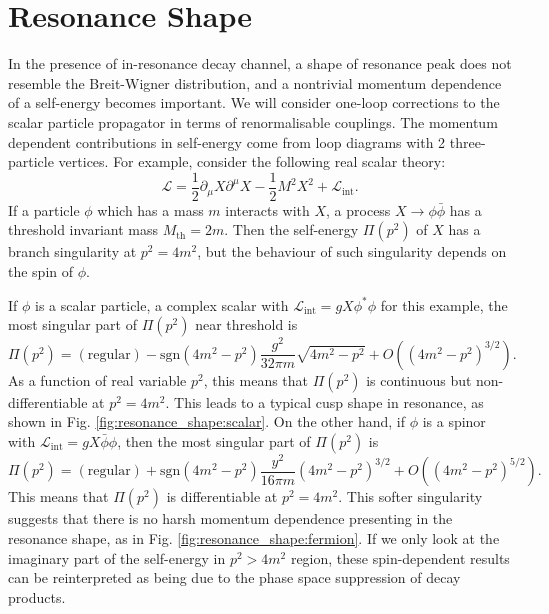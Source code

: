 \documentclass[11pt]{article}
\theoremstyle{definition}
\theoremstyle{remark}
\begin{document}
	\section{Resonance Shape}
	In the presence of in-resonance decay channel, a shape of resonance peak does not resemble the Breit-Wigner distribution, and a nontrivial momentum dependence of a self-energy becomes important.	
	We will consider one-loop corrections to the scalar particle propagator in terms of renormalisable couplings.
	The momentum dependent contributions in self-energy come from loop diagrams with 2 three-particle vertices.
	For example, consider the following real scalar theory:
	\[\mathcal{L}=\frac{1}{2}\partial_{\mu}X\partial^{\mu}X-\frac{1}{2}M^{2}X^{2}+\mathcal{L}_{\mathrm{int}}.\]
	If a particle $\phi$ which has a mass $m$ interacts with $X$, a process $X\to\phi\bar{\phi}$ has a threshold invariant mass $M_{\mathrm{th}}=2m$.
	Then the self-energy $\Pi(p^{2})$ of $X$ has a branch singularity at $p^{2}=4m^{2}$, but the behaviour of such singularity depends on the spin of $\phi$.
	
	If $\phi$ is a scalar particle, a complex scalar with $\mathcal{L}_{\mathrm{int}}=gX\phi^{\ast}\phi$ for this example, the most singular part of $\Pi(p^{2})$ near threshold is
	\[\Pi(p^{2})=(\mathrm{regular})-\mathrm{sgn}(4m^{2}-p^{2})\frac{g^{2}}{32\pi m}\sqrt{4m^{2}-p^{2}}+O((4m^{2}-p^{2})^{3/2}).\]
	As a function of real variable $p^{2}$, this means that $\Pi(p^{2})$ is continuous but non-differentiable at $p^{2}=4m^{2}$.
	This leads to a typical cusp shape in resonance, as shown in Fig. \ref{fig:resonance_shape:scalar}.
	On the other hand, if $\phi$ is a spinor with $\mathcal{L}_{\mathrm{int}}=gX\bar{\phi}\phi$, then the most singular part of $\Pi(p^{2})$ is
	\[\Pi(p^{2})=(\mathrm{regular})+\mathrm{sgn}(4m^{2}-p^{2})\frac{y^{2}}{16\pi m}(4m^{2}-p^{2})^{3/2}+O((4m^{2}-p^{2})^{5/2}).\]
	This means that $\Pi(p^{2})$ is differentiable at $p^{2}=4m^{2}$.
	This softer singularity suggests that there is no harsh momentum dependence presenting in the resonance shape, as in Fig. \ref{fig:resonance_shape:fermion}.
	If we only look at the imaginary part of the self-energy in $p^{2}>4m^{2}$ region, these spin-dependent results can be reinterpreted as being due to the phase space suppression of decay products.
	
\end{document}
